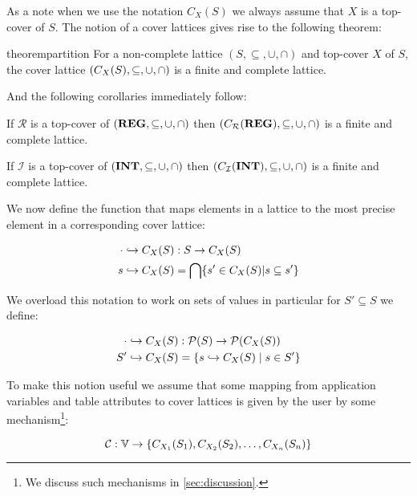 As a note when we use the notation $C_X(S)$ we always assume that $X$ is a top-cover of $S$.
The notion of a cover lattices gives rise to the following theorem:

\begin{restatable}{theorem}{partition}\label{thm:partition}
For a non-complete lattice $(S, \subseteq, \cup, \cap)$ and top-cover $X$ of $S$, the cover lattice $(C_{X}(S), \subseteq, \cup, \cap)$ is a finite and complete lattice.
\end{restatable}

And the following corollaries immediately follow:

\begin{corollary}\label{co:topcoverr}
    If $\mathcal{R}$ is a top-cover of $(\mathbf{REG}, \subseteq, \cup, \cap)$ then $(C_{\mathcal{R}}(\mathbf{REG}), \subseteq, \cup, \cap)$ is a finite and complete lattice.
\end{corollary}

\begin{corollary}\label{co:topcoveri}
    If $\mathcal{I}$ is a top-cover of $(\mathbf{INT}, \subseteq, \cup, \cap)$ then $(C_{\mathcal{I}}(\mathbf{INT}), \subseteq, \cup, \cap)$ is a finite and complete lattice.
\end{corollary}

We now define the function that maps elements in a lattice to the most precise element in a corresponding cover lattice:

\begin{align}
    \cdot \hookrightarrow C_X(S) &: S\rightarrow C_X(S) \\
    s \hookrightarrow C_X(S) &= \bigcap\{s' \in C_X(S)|s \subseteq s'\}
\end{align}

We overload this notation to work on sets of values in particular for $S' \subseteq S$ we define:

\begin{align}
    \cdot \hookrightarrow C_X(S) &: \mathcal{P}(S) \rightarrow \mathcal{P}(C_X(S)) \\
    S' \hookrightarrow C_X (S) &= \{s \hookrightarrow C_X(S) \mid s \in S'\}
\end{align}

To make this notion useful we assume that some mapping from application variables and table attributes to cover lattices is given by the user by some mechanism\footnote{We discuss such mechanisms in \autoref{sec:discussion}.}:

\begin{equation}\label{eq:lookupcl}
    \lookupcl : \mathbb{V} \rightarrow \{ C_{X_1}(S_1), C_{X_2}(S_2), \dots, C_{X_n}(S_n) \}
\end{equation}



